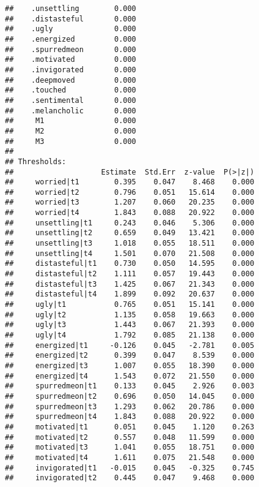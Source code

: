 \documentclass[
]{article}
\begin{document}
\begin{verbatim}
##    .unsettling        0.000                           
##    .distasteful       0.000                           
##    .ugly              0.000                           
##    .energized         0.000                           
##    .spurredmeon       0.000                           
##    .motivated         0.000                           
##    .invigorated       0.000                           
##    .deepmoved         0.000                           
##    .touched           0.000                           
##    .sentimental       0.000                           
##    .melancholic       0.000                           
##     M1                0.000                           
##     M2                0.000                           
##     M3                0.000                           
## 
## Thresholds:
##                    Estimate  Std.Err  z-value  P(>|z|)
##     worried|t1        0.395    0.047    8.468    0.000
##     worried|t2        0.796    0.051   15.614    0.000
##     worried|t3        1.207    0.060   20.235    0.000
##     worried|t4        1.843    0.088   20.922    0.000
##     unsettling|t1     0.243    0.046    5.306    0.000
##     unsettling|t2     0.659    0.049   13.421    0.000
##     unsettling|t3     1.018    0.055   18.511    0.000
##     unsettling|t4     1.501    0.070   21.508    0.000
##     distasteful|t1    0.730    0.050   14.595    0.000
##     distasteful|t2    1.111    0.057   19.443    0.000
##     distasteful|t3    1.425    0.067   21.343    0.000
##     distasteful|t4    1.899    0.092   20.637    0.000
##     ugly|t1           0.765    0.051   15.141    0.000
##     ugly|t2           1.135    0.058   19.663    0.000
##     ugly|t3           1.443    0.067   21.393    0.000
##     ugly|t4           1.792    0.085   21.138    0.000
##     energized|t1     -0.126    0.045   -2.781    0.005
##     energized|t2      0.399    0.047    8.539    0.000
##     energized|t3      1.007    0.055   18.390    0.000
##     energized|t4      1.543    0.072   21.550    0.000
##     spurredmeon|t1    0.133    0.045    2.926    0.003
##     spurredmeon|t2    0.696    0.050   14.045    0.000
##     spurredmeon|t3    1.293    0.062   20.786    0.000
##     spurredmeon|t4    1.843    0.088   20.922    0.000
##     motivated|t1      0.051    0.045    1.120    0.263
##     motivated|t2      0.557    0.048   11.599    0.000
##     motivated|t3      1.041    0.055   18.751    0.000
##     motivated|t4      1.611    0.075   21.548    0.000
##     invigorated|t1   -0.015    0.045   -0.325    0.745
##     invigorated|t2    0.445    0.047    9.468    0.000

\end{verbatim}
\end{document}
